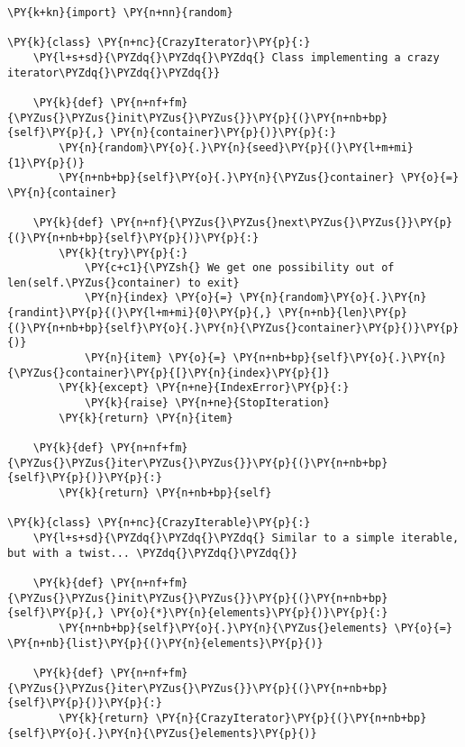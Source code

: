 \begin{Verbatim}[label=\makebox{\url{https://github.com/lucabaldini/cmepda/tree/master/slides/latex/snippets/crazy\_iterator.py}},commandchars=\\\{\}]
\PY{k+kn}{import} \PY{n+nn}{random}

\PY{k}{class} \PY{n+nc}{CrazyIterator}\PY{p}{:}
    \PY{l+s+sd}{\PYZdq{}\PYZdq{}\PYZdq{} Class implementing a crazy iterator\PYZdq{}\PYZdq{}\PYZdq{}}
    
    \PY{k}{def} \PY{n+nf+fm}{\PYZus{}\PYZus{}init\PYZus{}\PYZus{}}\PY{p}{(}\PY{n+nb+bp}{self}\PY{p}{,} \PY{n}{container}\PY{p}{)}\PY{p}{:}
        \PY{n}{random}\PY{o}{.}\PY{n}{seed}\PY{p}{(}\PY{l+m+mi}{1}\PY{p}{)}
        \PY{n+nb+bp}{self}\PY{o}{.}\PY{n}{\PYZus{}container} \PY{o}{=} \PY{n}{container}
    
    \PY{k}{def} \PY{n+nf}{\PYZus{}\PYZus{}next\PYZus{}\PYZus{}}\PY{p}{(}\PY{n+nb+bp}{self}\PY{p}{)}\PY{p}{:}
        \PY{k}{try}\PY{p}{:}
            \PY{c+c1}{\PYZsh{} We get one possibility out of len(self.\PYZus{}container) to exit}
            \PY{n}{index} \PY{o}{=} \PY{n}{random}\PY{o}{.}\PY{n}{randint}\PY{p}{(}\PY{l+m+mi}{0}\PY{p}{,} \PY{n+nb}{len}\PY{p}{(}\PY{n+nb+bp}{self}\PY{o}{.}\PY{n}{\PYZus{}container}\PY{p}{)}\PY{p}{)}
            \PY{n}{item} \PY{o}{=} \PY{n+nb+bp}{self}\PY{o}{.}\PY{n}{\PYZus{}container}\PY{p}{[}\PY{n}{index}\PY{p}{]}
        \PY{k}{except} \PY{n+ne}{IndexError}\PY{p}{:}
            \PY{k}{raise} \PY{n+ne}{StopIteration}
        \PY{k}{return} \PY{n}{item}
    
    \PY{k}{def} \PY{n+nf+fm}{\PYZus{}\PYZus{}iter\PYZus{}\PYZus{}}\PY{p}{(}\PY{n+nb+bp}{self}\PY{p}{)}\PY{p}{:}
        \PY{k}{return} \PY{n+nb+bp}{self}

\PY{k}{class} \PY{n+nc}{CrazyIterable}\PY{p}{:}
    \PY{l+s+sd}{\PYZdq{}\PYZdq{}\PYZdq{} Similar to a simple iterable, but with a twist... \PYZdq{}\PYZdq{}\PYZdq{}}
    
    \PY{k}{def} \PY{n+nf+fm}{\PYZus{}\PYZus{}init\PYZus{}\PYZus{}}\PY{p}{(}\PY{n+nb+bp}{self}\PY{p}{,} \PY{o}{*}\PY{n}{elements}\PY{p}{)}\PY{p}{:}
        \PY{n+nb+bp}{self}\PY{o}{.}\PY{n}{\PYZus{}elements} \PY{o}{=} \PY{n+nb}{list}\PY{p}{(}\PY{n}{elements}\PY{p}{)}
    
    \PY{k}{def} \PY{n+nf+fm}{\PYZus{}\PYZus{}iter\PYZus{}\PYZus{}}\PY{p}{(}\PY{n+nb+bp}{self}\PY{p}{)}\PY{p}{:}
        \PY{k}{return} \PY{n}{CrazyIterator}\PY{p}{(}\PY{n+nb+bp}{self}\PY{o}{.}\PY{n}{\PYZus{}elements}\PY{p}{)}
\end{Verbatim}